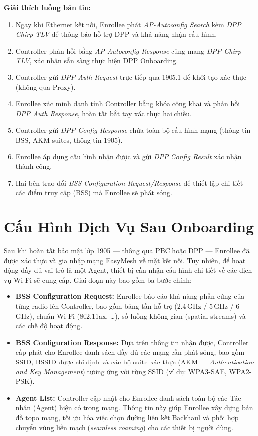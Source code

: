 \textbf{Giải thích luồng bản tin:}
\begin{enumerate}
	\item Ngay khi Ethernet kết nối, Enrollee phát \textit{AP-Autoconfig Search} kèm
	\textit{DPP Chirp TLV} để thông báo hỗ trợ DPP và khả năng nhận cấu hình.
	\item Controller phản hồi bằng \textit{AP-Autoconfig Response} cũng mang
	\textit{DPP Chirp TLV}, xác nhận sẵn sàng thực hiện DPP Onboarding.
	\item Controller gửi \textit{DPP Auth Request} trực tiếp qua 1905.1 để khởi tạo
	xác thực (không qua Proxy).
	\item Enrollee xác minh danh tính Controller bằng khóa công khai và phản hồi
	\textit{DPP Auth Response}, hoàn tất bắt tay xác thực hai chiều.
	\item Controller gửi \textit{DPP Config Response} chứa toàn bộ cấu hình mạng
	(thông tin BSS, AKM suites, thông tin 1905).
	\item Enrollee áp dụng cấu hình nhận được và gửi \textit{DPP Config Result} xác nhận
	thành công.
	\item Hai bên trao đổi \textit{BSS Configuration Request/Response} để thiết lập
	chi tiết các điểm truy cập (BSS) mà Enrollee sẽ phát sóng.
\end{enumerate}


\section{Cấu Hình Dịch Vụ Sau Onboarding}

Sau khi hoàn tất bảo mật lớp 1905 --- thông qua PBC hoặc DPP --- Enrollee đã được xác
thực và gia nhập mạng EasyMesh về mặt kết nối. Tuy nhiên, để hoạt động đầy đủ vai trò
là một Agent, thiết bị cần nhận cấu hình chi tiết về các dịch vụ Wi-Fi sẽ cung cấp.
Giai đoạn này bao gồm ba bước chính:

\begin{itemize}
	\item \textbf{BSS Configuration Request:} Enrollee báo cáo khả năng phần cứng của
	từng radio lên Controller, bao gồm băng tần hỗ trợ (2.4\,GHz / 5\,GHz / 6\,GHz),
	chuẩn Wi-Fi (802.11ax, \ldots), số luồng không gian (spatial streams) và các chế
	độ hoạt động.
	\item \textbf{BSS Configuration Response:} Dựa trên thông tin nhận được, Controller
	cấp phát cho Enrollee danh sách đầy đủ các mạng cần phát sóng, bao gồm SSID,
	BSSID được chỉ định và các bộ suite xác thực
	(AKM --- \textit{Authentication and Key Management}) tương ứng với từng SSID
	(ví dụ: WPA3-SAE, WPA2-PSK).
	\item \textbf{Agent List:} Controller cập nhật cho Enrollee danh sách toàn bộ các
	Tác nhân (Agent) hiện có trong mạng. Thông tin này giúp Enrollee xây dựng bản
	đồ topo mạng, tối ưu hóa việc chọn đường liên kết Backhaul và phối hợp chuyển
	vùng liền mạch (\textit{seamless roaming}) cho các thiết bị người dùng.
\end{itemize}